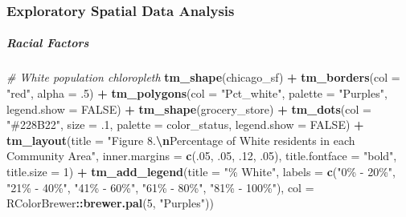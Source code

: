 \documentclass[
]{article}
\newenvironment{Shaded}{\begin{snugshade}}{\end{snugshade}}
\newcommand{\AttributeTok}[1]{\textcolor[rgb]{0.13,0.29,0.53}{#1}}
\newcommand{\CommentTok}[1]{\textcolor[rgb]{0.56,0.35,0.01}{\textit{#1}}}
\newcommand{\ConstantTok}[1]{\textcolor[rgb]{0.56,0.35,0.01}{#1}}
\newcommand{\DecValTok}[1]{\textcolor[rgb]{0.00,0.00,0.81}{#1}}
\newcommand{\FunctionTok}[1]{\textcolor[rgb]{0.13,0.29,0.53}{\textbf{#1}}}
\newcommand{\NormalTok}[1]{#1}
\newcommand{\SpecialCharTok}[1]{\textcolor[rgb]{0.81,0.36,0.00}{\textbf{#1}}}
\newcommand{\StringTok}[1]{\textcolor[rgb]{0.31,0.60,0.02}{#1}}
\begin{document}
\hypertarget{exploratory-spatial-data-analysis}{%
\subsubsection{\texorpdfstring{\textbf{Exploratory Spatial Data
Analysis}}{Exploratory Spatial Data Analysis}}\label{exploratory-spatial-data-analysis}}

\hypertarget{racial-factors}{%
\subparagraph{Racial Factors}\label{racial-factors}}

\begin{Shaded}
\begin{Highlighting}[]
\CommentTok{\# White population chloropleth}
\FunctionTok{tm\_shape}\NormalTok{(chicago\_sf) }\SpecialCharTok{+}
  \FunctionTok{tm\_borders}\NormalTok{(}\AttributeTok{col =} \StringTok{"red"}\NormalTok{, }\AttributeTok{alpha =}\NormalTok{ .}\DecValTok{5}\NormalTok{) }\SpecialCharTok{+}
  \FunctionTok{tm\_polygons}\NormalTok{(}\AttributeTok{col =} \StringTok{"Pct\_white"}\NormalTok{,}
              \AttributeTok{palette =} \StringTok{"Purples"}\NormalTok{,}
              \AttributeTok{legend.show =} \ConstantTok{FALSE}\NormalTok{) }\SpecialCharTok{+}
  \FunctionTok{tm\_shape}\NormalTok{(grocery\_store) }\SpecialCharTok{+}
  \FunctionTok{tm\_dots}\NormalTok{(}\AttributeTok{col =} \StringTok{"\#228B22"}\NormalTok{,}
          \AttributeTok{size =}\NormalTok{ .}\DecValTok{1}\NormalTok{,}
          \AttributeTok{palette =}\NormalTok{ color\_status,}
          \AttributeTok{legend.show =} \ConstantTok{FALSE}\NormalTok{) }\SpecialCharTok{+}
  \FunctionTok{tm\_layout}\NormalTok{(}\AttributeTok{title =} \StringTok{"Figure 8.}\SpecialCharTok{\textbackslash{}n}\StringTok{Percentage of White residents in each Community Area"}\NormalTok{,}
            \AttributeTok{inner.margins =} \FunctionTok{c}\NormalTok{(.}\DecValTok{05}\NormalTok{, .}\DecValTok{05}\NormalTok{, .}\DecValTok{12}\NormalTok{, .}\DecValTok{05}\NormalTok{),}
            \AttributeTok{title.fontface =} \StringTok{"bold"}\NormalTok{,}
            \AttributeTok{title.size =} \DecValTok{1}\NormalTok{) }\SpecialCharTok{+}
    \FunctionTok{tm\_add\_legend}\NormalTok{(}\AttributeTok{title =} \StringTok{"\% White"}\NormalTok{,}
                \AttributeTok{labels =} \FunctionTok{c}\NormalTok{(}\StringTok{"0\% {-} 20\%"}\NormalTok{,}
                           \StringTok{"21\% {-} 40\%"}\NormalTok{,}
                           \StringTok{"41\% {-} 60\%"}\NormalTok{,}
                           \StringTok{"61\% {-} 80\%"}\NormalTok{,}
                           \StringTok{"81\% {-} 100\%"}\NormalTok{),}
                \AttributeTok{col =}\NormalTok{ RColorBrewer}\SpecialCharTok{::}\FunctionTok{brewer.pal}\NormalTok{(}\DecValTok{5}\NormalTok{, }\StringTok{"Purples"}\NormalTok{))}
\end{Highlighting}
\end{Shaded}
\end{document}
